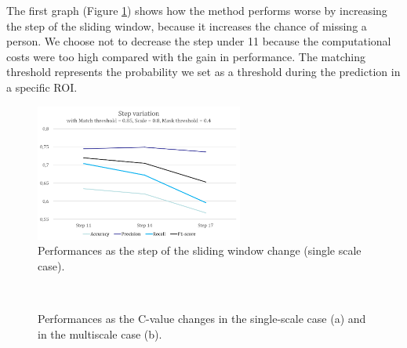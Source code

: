 \documentclass[a4paper, 11pt, onecolumn]{article} %
\begin{document}
The first graph (Figure \ref{fig:step}) shows how the method performs worse by increasing the step of the sliding window, because it increases the chance of missing a person. We choose not to decrease the step under 11 because the computational costs were too high compared with the gain in performance.  The matching threshold represents the probability we set as a threshold during the prediction in a specific ROI.
\begin{figure}[h!]
\centering
\includegraphics[height=4.5cm]{step_variation.png} 
\caption{Performances as the step of the sliding window change (single scale case).}
\label{fig:step}
\end{figure}

\begin{figure}[h!]
\centering
{}\\
\caption{Performances as the C-value changes in the single-scale case (a) and in the multiscale case (b).}
\label{fig:cvalue}
\end{figure}
\end{document}
